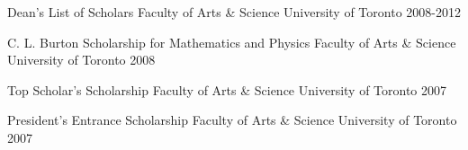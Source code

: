 \begin{cvhonors}
  \cvhonorsecond
    {Dean's List of Scholars} %
    {Faculty of Arts \& Science } %
    {University of Toronto} %
    {2008-2012} %
    
  \cvhonorsecond
    {C. L. Burton Scholarship for Mathematics and Physics} %
    {Faculty of Arts \& Science} %
    {University of Toronto} %
    {2008} %
    
  \cvhonorsecond
    {Top Scholar's Scholarship} %
    {Faculty of Arts \& Science} %
    {University of Toronto} %
    {2007} %

  \cvhonorsecond
    {President's Entrance Scholarship} %
    {Faculty of Arts \& Science } %
    {University of Toronto} %
    {2007} %
\end{cvhonors}
\vspace{-2mm}
